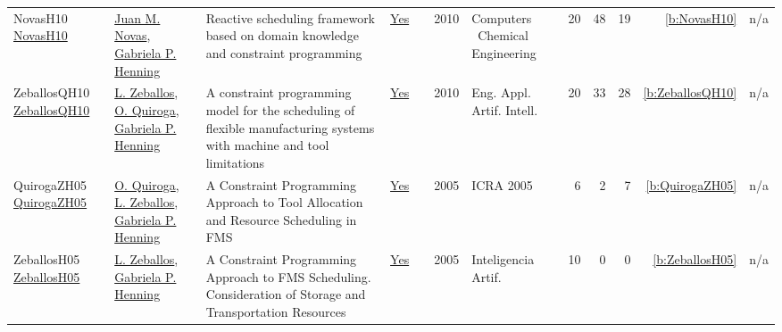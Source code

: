 {\begin{longtable}{>{\raggedright\arraybackslash}p{3cm}>{\raggedright\arraybackslash}p{6cm}>{\raggedright\arraybackslash}p{6.5cm}rrrp{2.5cm}rrrrr}
NovasH10 \href{https://doi.org/10.1016/j.compchemeng.2010.07.011}{NovasH10} & \hyperref[auth:a527]{Juan M. Novas}, \hyperref[auth:a594]{Gabriela P. Henning} & Reactive scheduling framework based on domain knowledge and constraint programming & \href{../works/NovasH10.pdf}{Yes} & \cite{NovasH10} & 2010 & Computers \  Chemical Engineering & 20 & 48 & 19 & \ref{b:NovasH10} & n/a\\
ZeballosQH10 \href{https://doi.org/10.1016/j.engappai.2009.07.002}{ZeballosQH10} & \hyperref[auth:a627]{L. Zeballos}, \hyperref[auth:a628]{O. Quiroga}, \hyperref[auth:a594]{Gabriela P. Henning} & A constraint programming model for the scheduling of flexible manufacturing systems with machine and tool limitations & \href{../works/ZeballosQH10.pdf}{Yes} & \cite{ZeballosQH10} & 2010 & Eng. Appl. Artif. Intell. & 20 & 33 & 28 & \ref{b:ZeballosQH10} & n/a\\
QuirogaZH05 \href{https://doi.org/10.1109/ROBOT.2005.1570686}{QuirogaZH05} & \hyperref[auth:a628]{O. Quiroga}, \hyperref[auth:a627]{L. Zeballos}, \hyperref[auth:a594]{Gabriela P. Henning} & A Constraint Programming Approach to Tool Allocation and Resource Scheduling in {FMS} & \href{../works/QuirogaZH05.pdf}{Yes} & \cite{QuirogaZH05} & 2005 & ICRA 2005 & 6 & 2 & 7 & \ref{b:QuirogaZH05} & n/a\\
ZeballosH05 \href{http://journal.iberamia.org/index.php/ia/article/view/452/article\%20\%281\%29.pdf}{ZeballosH05} & \hyperref[auth:a627]{L. Zeballos}, \hyperref[auth:a594]{Gabriela P. Henning} & A Constraint Programming Approach to {FMS} Scheduling. Consideration of Storage and Transportation Resources & \href{../works/ZeballosH05.pdf}{Yes} & \cite{ZeballosH05} & 2005 & Inteligencia Artif. & 10 & 0 & 0 & \ref{b:ZeballosH05} & n/a\\
\end{longtable}
}

\clearpage
